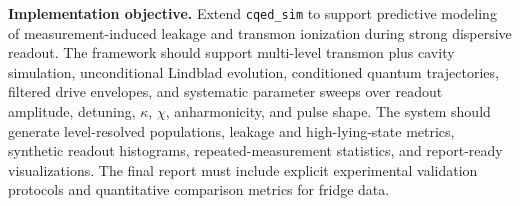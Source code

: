 \documentclass[11pt]{article}
\begin{document}
\noindent\textbf{Implementation objective.}
Extend \texttt{cqed\_sim} to support predictive modeling of measurement-induced leakage and
transmon ionization during strong dispersive readout. The framework should support
multi-level transmon plus cavity simulation, unconditional Lindblad evolution, conditioned
quantum trajectories, filtered drive envelopes, and systematic parameter sweeps over
readout amplitude, detuning, $\kappa$, $\chi$, anharmonicity, and pulse shape. The system
should generate level-resolved populations, leakage and high-lying-state metrics, synthetic
readout histograms, repeated-measurement statistics, and report-ready visualizations. The
final report must include explicit experimental validation protocols and quantitative
comparison metrics for fridge data.
\end{document}
